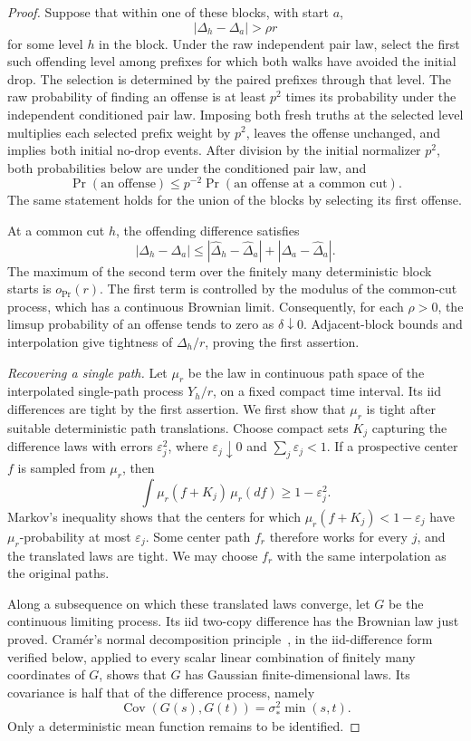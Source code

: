 \begin{proof}
Suppose that within one of these blocks, with start \(a\),
\[
 |\Delta_h-\Delta_a|>\rho r
\]
for some level \(h\) in the block. Under the raw independent pair
law, select the first such offending level among prefixes for which
both walks have avoided the initial drop. The selection is determined
by the paired prefixes through that level. The raw probability of
finding an offense is at least \(p^2\) times its probability under
the independent conditioned pair law. Imposing both fresh truths at
the selected level multiplies each selected prefix weight by \(p^2\),
leaves the offense unchanged, and implies both initial no-drop events.
After division by the initial normalizer \(p^2\), both probabilities
below are under the conditioned pair law, and
\[
 \Pr(\text{an offense})
 \le p^{-2}\Pr(\text{an offense at a common cut}).
\]
The same statement holds for the union of the blocks by selecting its
first offense.

At a common cut \(h\), the offending difference satisfies
\[
 |\Delta_h-\Delta_a|
 \le |\widehat\Delta_h-\widehat\Delta_a|
       +|\Delta_a-\widehat\Delta_a|.
\]
The maximum of the second term over the finitely many deterministic
block starts is \(o_{\Pr}(r)\). The first term is controlled by the
modulus of the common-cut process, which has a continuous Brownian
limit. Consequently, for each \(\rho>0\), the limsup probability of
an offense tends to zero as \(\delta\downarrow0\). Adjacent-block
bounds and interpolation give tightness of \(\Delta_h/r\), proving
the first assertion.

\emph{Recovering a single path.}
Let \(\mu_r\) be the law in continuous path space of the interpolated
single-path process \(Y_h/r\), on a fixed compact time interval. Its
iid differences are tight by the first assertion. We first show that
\(\mu_r\) is tight after suitable deterministic path translations.
Choose compact sets \(K_j\) capturing the difference laws with errors
\(\varepsilon_j^2\), where \(\varepsilon_j\downarrow0\) and
\(\sum_j\varepsilon_j<1\). If a prospective center \(f\) is sampled
from \(\mu_r\), then
\[
 \int\mu_r(f+K_j)\,\mu_r(df)\ge1-\varepsilon_j^2.
\]
Markov's inequality shows that the centers for which
\(\mu_r(f+K_j)<1-\varepsilon_j\) have \(\mu_r\)-probability at
most \(\varepsilon_j\). Some center path \(f_r\) therefore works
for every \(j\), and the translated laws are tight. We may choose
\(f_r\) with the same interpolation as the original paths.

Along a subsequence on which these translated laws converge, let
\(G\) be the continuous limiting process. Its iid two-copy difference
has the Brownian law just proved. Cram\'er's normal decomposition
principle~\cite{Cramer1936}, in the iid-difference form verified below,
applied to every scalar linear combination of finitely many coordinates
of \(G\), shows that \(G\) has Gaussian finite-dimensional laws.
Its covariance is half that of the difference process, namely
\[
 \operatorname{Cov}(G(s),G(t))=\sigma_*^2\min(s,t).
\]
Only a deterministic mean function remains to be identified.


\end{proof}
